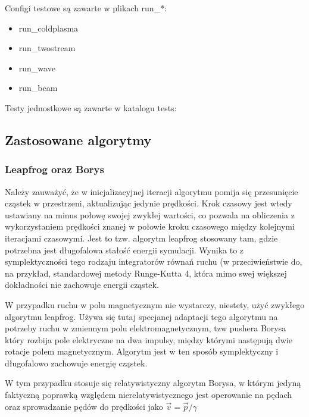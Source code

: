 Configi testowe są zawarte w plikach run\_*: %
\begin{itemize}
\item run\_coldplasma
\item run\_twostream
\item run\_wave
\item run\_beam
\end{itemize}

Testy jednostkowe są zawarte w katalogu tests:

\subsection{Zastosowane algorytmy}

\subsubsection{Leapfrog oraz Borys} %
Należy zauważyć, że w inicjalizacyjnej iteracji algorytmu pomija się przesunięcie cząstek w przestrzeni, aktualizując jedynie
prędkości. Krok czasowy jest wtedy ustawiany na minus połowę swojej zwykłej wartości, co pozwala na obliczenia
z wykorzystaniem prędkości znanej w połowie kroku czasowego między kolejnymi iteracjami czasowymi. Jest to tzw. algorytm
leapfrog %
stosowany tam, gdzie potrzebna jest długofalowa stałość energii symulacji. Wynika to z symplektyczności %
tego rodzaju integratorów równań ruchu (w przeciwieństwie do, na przykład, standardowej metody Runge-Kutta 4, która
mimo swej większej dokładności nie zachowuje energii cząstek.

W przypadku ruchu w polu magnetycznym nie wystarczy, niestety, użyć zwykłego algorytmu leapfrog. %
Używa się tutaj specjanej adaptacji tego algorytmu na potrzeby ruchu w zmiennym polu elektromagnetycznym,
tzw pushera %
Borysa %
który rozbija pole elektryczne na dwa impulsy, między którymi następują dwie %
rotacje polem magnetycznym. Algorytm jest w ten sposób symplektyczny %
i długofalowo zachowuje energię cząstek.

W tym przypadku stosuje się relatywistyczny algorytm Borysa, w którym jedyną faktyczną poprawką względem
nierelatywistycznego jest operowanie na pędach oraz sprowadzanie pędów do prędkości jako $\vec{v} = \vec{p} / \gamma$ %

